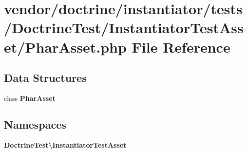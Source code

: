 \section{vendor/doctrine/instantiator/tests/\+Doctrine\+Test/\+Instantiator\+Test\+Asset/\+Phar\+Asset.php File Reference}
\label{_phar_asset_8php}
\subsection*{Data Structures}
\begin{DoxyCompactItemize}
\item 
class {\bf Phar\+Asset}
\end{DoxyCompactItemize}
\subsection*{Namespaces}
\begin{DoxyCompactItemize}
\item 
 {\bf Doctrine\+Test\textbackslash{}\+Instantiator\+Test\+Asset}
\end{DoxyCompactItemize}
